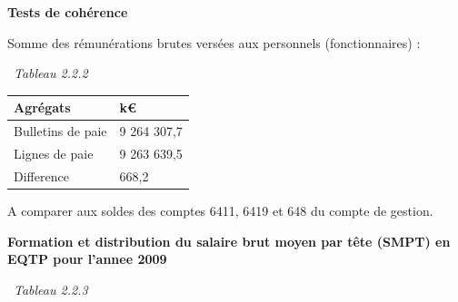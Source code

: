 \textbf{Tests de cohérence}

Somme des rémunérations brutes versées aux personnels (fonctionnaires) :

~\emph{Tableau 2.2.2}

\begin{longtable}[]{@{}ll@{}}
\toprule
Agrégats & k€\tabularnewline
\midrule
\endhead
Bulletins de paie & 9 264 307,7\tabularnewline
Lignes de paie & 9 263 639,5\tabularnewline
Difference & 668,2\tabularnewline
\bottomrule
\end{longtable}

A comparer aux soldes des comptes 6411, 6419 et 648 du compte de
gestion.

\textbf{Formation et distribution du salaire brut moyen par tête (SMPT)
en EQTP pour l'annee 2009 }

~\emph{Tableau 2.2.3}

